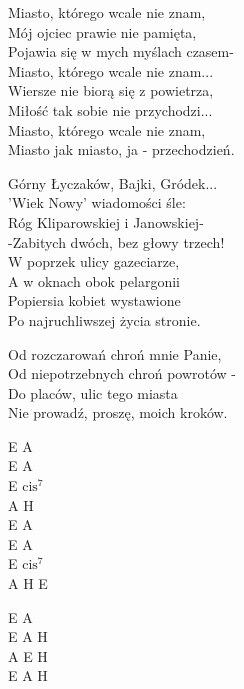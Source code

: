 \begin{text}
\vin Miasto, którego wcale nie znam,\\
\vin Mój ojciec prawie nie pamięta,\\
\vin Pojawia się w mych myślach czasem-\\
\vin Miasto, którego wcale nie znam...\\
\vin Wiersze nie biorą się z powietrza,\\
\vin Miłość tak sobie nie przychodzi...\\
\vin Miasto, którego wcale nie znam,\\
\vin Miasto jak miasto, ja - przechodzień.

Górny Łyczaków, Bajki, Gródek...\\
'Wiek Nowy' wiadomości śle:\\
Róg Kliparowskiej i Janowskiej-\\
-Zabitych dwóch, bez głowy trzech!\\
W poprzek ulicy gazeciarze,\\
A w oknach obok pelargonii\\
Popiersia kobiet wystawione\\
Po najruchliwszej życia stronie.

Od rozczarowań chroń mnie Panie,\\
Od niepotrzebnych chroń powrotów -\\
Do placów, ulic tego miasta\\
Nie prowadź, proszę, moich kroków. 
\end{text}
\begin{chord}
E A\\
E A\\
E $\mathrm{cis^7}$\\
A H\\
E A\\
E A\\
E $\mathrm{cis^7}$\\
A H E

E A\\
E A H\\
A E H\\
E A H
\end{chord}
